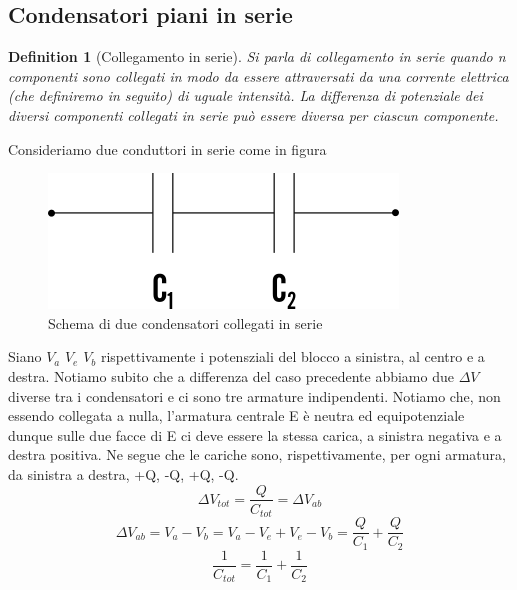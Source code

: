 \documentclass[10pt,a4paper]{article}
\newtheorem{definition}{Definition}
\begin{document}
\subsection*{Condensatori piani in serie}
\begin{definition}[Collegamento in serie]
	Si parla di collegamento in serie quando n componenti sono collegati in modo da essere attraversati da una corrente elettrica (che definiremo in seguito) di uguale intensità. La differenza di potenziale dei diversi componenti collegati in serie può essere diversa per ciascun componente.
\end{definition}
Consideriamo due conduttori in serie come in figura
\begin{figure}[h!]
	\centering
	\includegraphics[width=0.6\linewidth]{images/Condensatori_serie}
	\caption{Schema di due condensatori collegati in serie}
	\label{fig:condensatoriserie}
\end{figure}
\FloatBarrier
Siano \(V_a\) \(V_e\) \(V_b\) rispettivamente i potensziali del blocco a sinistra, al centro e a destra. Notiamo subito che a differenza del caso precedente abbiamo due \(\Delta V\) diverse tra i condensatori e ci sono tre armature indipendenti. Notiamo che, non essendo collegata a nulla, l'armatura centrale E è neutra ed equipotenziale dunque sulle due facce di E ci deve essere la stessa carica, a sinistra negativa e a destra positiva. Ne segue che le cariche sono, rispettivamente, per ogni armatura, da sinistra a destra, +Q, -Q, +Q, -Q. 
\[\Delta V_{tot} = \frac{Q}{C_{tot}} = \Delta V_{ab}\]
\[\Delta V_{ab} = V_a-V_b=V_a-V_e+V_e-V_b = \frac{Q}{C_1}+\frac{Q}{C_2}\]
\[\frac{1}{C_{tot}} = \frac{1}{C_1} + \frac{1}{C_2}\]
\end{document}
